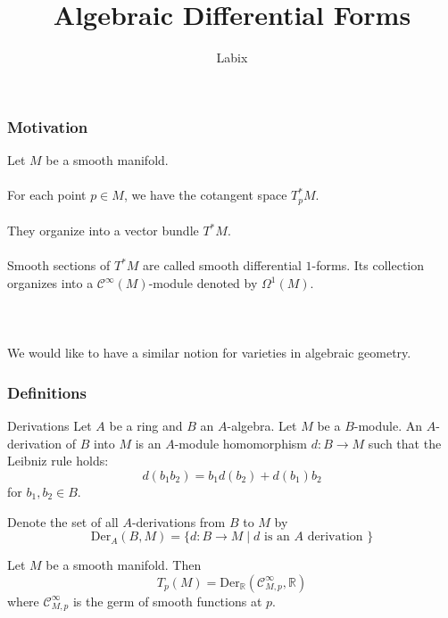 \documentclass[10pt]{beamer}
\title{Algebraic Differential Forms}
\author{Labix}
\newcommand{\R}{\mathbb{R}}
\begin{document}
\frame{\titlepage}

\begin{frame}[fragile]
\frametitle{Motivation}

Let $M$ be a smooth manifold. \\~\\

For each point $p\in M$, we have the cotangent space $T_p^\ast M$. \\~\\

They organize into a vector bundle $T^\ast M$. \\~\\

Smooth sections of $T^\ast M$ are called smooth differential $1$-forms. Its collection organizes into a $\mathcal{C}^\infty(M)$-module denoted by $\Omega^1(M)$. \\~\\

\\~\\

We would like to have a similar notion for varieties in algebraic geometry. 

\end{frame}

\begin{frame}[fragile]
\frametitle{Definitions}

\begin{block}{Derivations} Let $A$ be a ring and $B$ an $A$-algebra. Let $M$ be a $B$-module. An $A$-derivation of $B$ into $M$ is an $A$-module homomorphism $d:B\to M$ such that the Leibniz rule holds: $$d(b_1b_2)=b_1d(b_2)+d(b_1)b_2$$ for $b_1,b_2\in B$. 
\end{block}

Denote the set of all $A$-derivations from $B$ to $M$ by $$\text{Der}_A(B,M)=\{d:B\to M\;|\;d\text{ is an }A\text{ derivation }\}$$

\begin{examples} Let $M$ be a smooth manifold. Then $$T_p(M)=\text{Der}_\R(\mathcal{C}_{M,p}^\infty,\R)$$ where $\mathcal{C}_{M,p}^\infty$ is the germ of smooth functions at $p$. 
\end{examples}


\end{frame}
\end{document}
